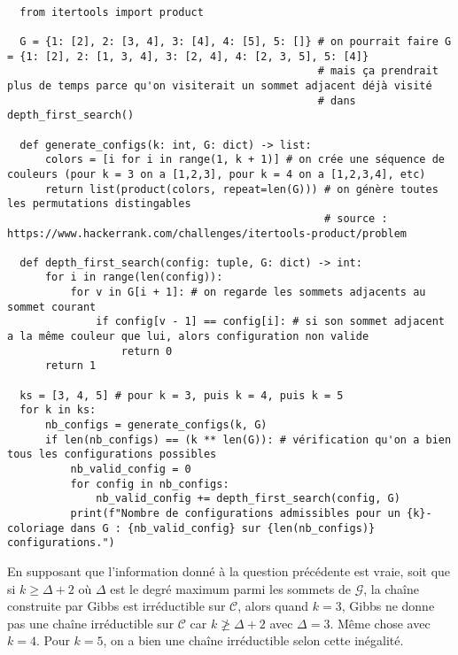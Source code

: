 \documentclass{article}
\begin{document}
\begin{verbatim}
  
  from itertools import product

  G = {1: [2], 2: [3, 4], 3: [4], 4: [5], 5: []} # on pourrait faire G = {1: [2], 2: [1, 3, 4], 3: [2, 4], 4: [2, 3, 5], 5: [4]}
                                                 # mais ça prendrait plus de temps parce qu'on visiterait un sommet adjacent déjà visité
                                                 # dans depth_first_search()

  def generate_configs(k: int, G: dict) -> list:
      colors = [i for i in range(1, k + 1)] # on crée une séquence de couleurs (pour k = 3 on a [1,2,3], pour k = 4 on a [1,2,3,4], etc)
      return list(product(colors, repeat=len(G))) # on génère toutes les permutations distingables 
                                                  # source : https://www.hackerrank.com/challenges/itertools-product/problem

  def depth_first_search(config: tuple, G: dict) -> int:
      for i in range(len(config)):
          for v in G[i + 1]: # on regarde les sommets adjacents au sommet courant
              if config[v - 1] == config[i]: # si son sommet adjacent a la même couleur que lui, alors configuration non valide
                  return 0
      return 1

  ks = [3, 4, 5] # pour k = 3, puis k = 4, puis k = 5
  for k in ks:
      nb_configs = generate_configs(k, G)
      if len(nb_configs) == (k ** len(G)): # vérification qu'on a bien tous les configurations possibles
          nb_valid_config = 0
          for config in nb_configs:
              nb_valid_config += depth_first_search(config, G)
          print(f"Nombre de configurations admissibles pour un {k}-coloriage dans G : {nb_valid_config} sur {len(nb_configs)} configurations.")

\end{verbatim}


En supposant que l'information donné à la question précédente est 
vraie, soit que si $k\ge\Delta+2$ où $\Delta$ est le degré maximum
parmi les sommets de $\mathcal{G}$, la chaîne construite par
Gibbs est irréductible sur $\mathcal{C}$, alors quand $k=3$, Gibbs 
ne donne pas une chaîne irréductible sur $\mathcal{C}$ car
$k\not\ge\Delta+2$ avec $\Delta=3$. Même chose avec $k=4$. Pour $k=5$,
on a bien une chaîne irréductible selon cette inégalité.
\end{document}
